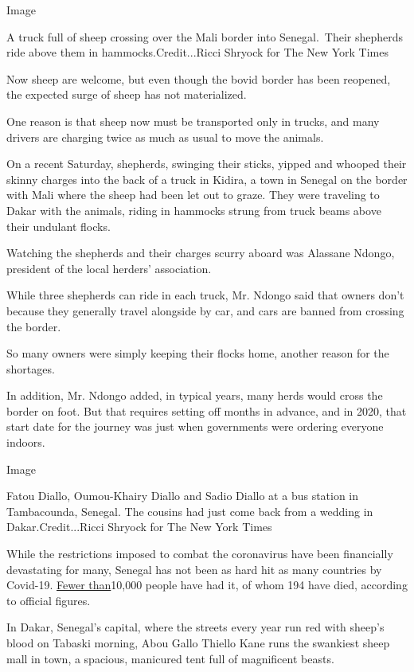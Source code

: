 Image

A truck full of sheep crossing over the Mali border into Senegal.~Their
shepherds ride above them in hammocks.Credit...Ricci Shryock for The New
York Times

Now sheep are welcome, but even though the bovid border has been
reopened, the expected surge of sheep has not materialized.

One reason is that sheep now must be transported only in trucks, and
many drivers are charging twice as much as usual to move the animals.

On a recent Saturday, shepherds, swinging their sticks, yipped and
whooped their skinny charges into the back of a truck in Kidira, a town
in Senegal on the border with Mali where the sheep had been let out to
graze. They were traveling to Dakar with the animals, riding in hammocks
strung from truck beams above their undulant flocks.

Watching the shepherds and their charges scurry aboard was Alassane
Ndongo, president of the local herders' association.

While three shepherds can ride in each truck, Mr. Ndongo said that
owners don't because they generally travel alongside by car, and cars
are banned from crossing the border.

So many owners were simply keeping their flocks home, another reason for
the shortages.

In addition, Mr. Ndongo added, in typical years, many herds would cross
the border on foot. But that requires setting off months in advance, and
in 2020, that start date for the journey was just when governments were
ordering everyone indoors.

Image

Fatou Diallo, Oumou-Khairy Diallo and Sadio Diallo at a bus station in
Tambacounda, Senegal. The cousins had just come back from a wedding in
Dakar.Credit...Ricci Shryock for The New York Times

While the restrictions imposed to combat the coronavirus have been
financially devastating for many, Senegal has not been as hard hit as
many countries by Covid-19.
\href{https://www.nytimes3xbfgragh.onion/interactive/2020/world/coronavirus-maps.html}{Fewer
than}10,000 people have had it, of whom 194 have died, according to
official figures.

In Dakar, Senegal's capital, where the streets every year run red with
sheep's blood on Tabaski morning, Abou Gallo Thiello Kane runs the
swankiest sheep mall in town, a spacious, manicured tent full of
magnificent beasts.

